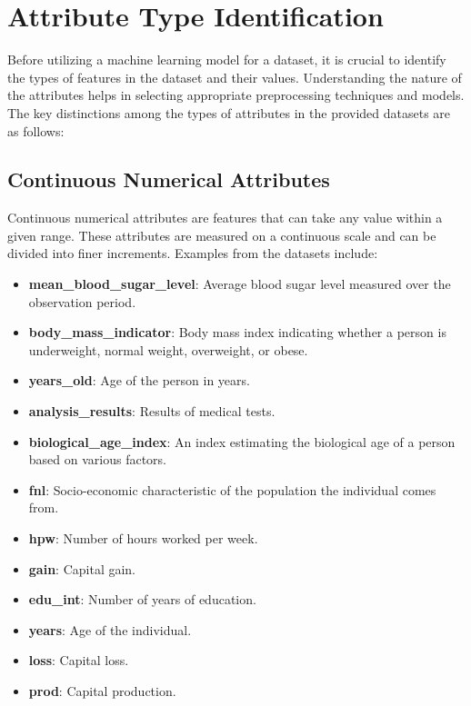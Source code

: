 \documentclass[a4paper,12pt]{article}
\begin{document}
\section{Attribute Type Identification}

Before utilizing a machine learning model for a dataset, it is crucial to identify the types of features in the dataset and their values. Understanding the nature of the attributes helps in selecting appropriate preprocessing techniques and models. The key distinctions among the types of attributes in the provided datasets are as follows:

\subsection{Continuous Numerical Attributes}

Continuous numerical attributes are features that can take any value within a given range. These attributes are measured on a continuous scale and can be divided into finer increments. Examples from the datasets include:

\begin{itemize}
    \item \textbf{mean\_blood\_sugar\_level}: Average blood sugar level measured over the observation period.
    \item \textbf{body\_mass\_indicator}: Body mass index indicating whether a person is underweight, normal weight, overweight, or obese.
    \item \textbf{years\_old}: Age of the person in years.
    \item \textbf{analysis\_results}: Results of medical tests.
    \item \textbf{biological\_age\_index}: An index estimating the biological age of a person based on various factors.
    \item \textbf{fnl}: Socio-economic characteristic of the population the individual comes from.
    \item \textbf{hpw}: Number of hours worked per week.
    \item \textbf{gain}: Capital gain.
    \item \textbf{edu\_int}: Number of years of education.
    \item \textbf{years}: Age of the individual.
    \item \textbf{loss}: Capital loss.
    \item \textbf{prod}: Capital production.
\end{itemize}
\end{document}
